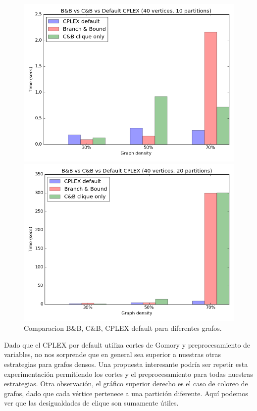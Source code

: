 \begin{figure}[h]
\begin{minipage}[b]{0.49\textwidth}
    \includegraphics[width=\textwidth]{img/8-compare_v40_p10_i1_l40_t1_b0.png}
  \end{minipage}
  \hfill
  \begin{minipage}[b]{0.49\textwidth}
    \includegraphics[width=\textwidth]{img/8-compare_v40_p20_i1_l40_t1_b0.png}
  \end{minipage}
	\caption{Comparacion B\&B, C\&B, CPLEX default para diferentes grafos.}
\end{figure}

Dado que el CPLEX por default utiliza cortes de Gomory y preprocesamiento de variables, no nos sorprende que en general sea superior a nuestras otras estrategias para grafos densos. Una propuesta interesante podría ser repetir esta experimentación permitiendo los cortes y el preprocesamiento para todas nuestras estrategias. Otra observación, el gráfico superior derecho es el caso de coloreo de grafos, dado que cada vértice pertenece a una partición diferente. Aquí podemos ver que las desigualdades de clique son sumamente útiles. 
